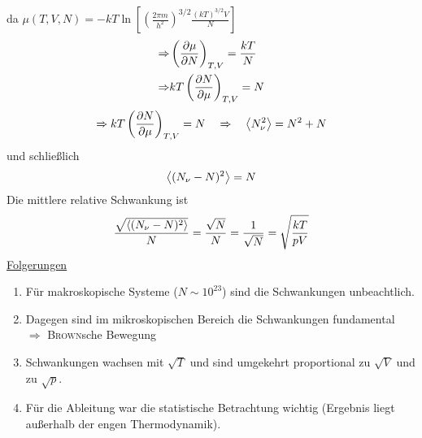 da $\mu(T, V, N) = - k T \ln \left[ \left( \frac{2 \pi m}{h^2} \right)^{3/2} \frac{ \left( k T \right)^{3/2} V}{N} \right]$
\begin{equation}
    \begin{split}
        \Rightarrow & \left( \frac{\partial \mu}{\partial N} \right)_{T, V} = \frac{k T}{N} \\
        \Rightarrow & k T \left( \frac{\partial N}{\partial \mu} \right)_{T, V} = N
    \end{split}
\end{equation}
\begin{equation}
    \Rightarrow k T \left( \frac{\partial N}{\partial \mu} \right)_{T, V} = N \quad \Rightarrow \quad \left\langle N_\nu^2\right\rangle = N^2 + N
\end{equation}
und schließlich
\begin{equation}
    \left\langle(N_\nu - N)^2\right\rangle = N
\end{equation}
Die mittlere relative Schwankung ist
\begin{equation}
    \frac{\sqrt{\left\langle(N_\nu - N)^2\right\rangle}}{N} = \frac{\sqrt{N}}{N} = \frac{1}{\sqrt{N}} = \sqrt{\frac{k T}{p V}}
\end{equation}
\underline{Folgerungen}
\begin{enumerate}
    \item Für makroskopische Systeme ($N \sim 10^{23}$) sind die Schwankungen unbeachtlich.
    \item Dagegen sind im mikroskopischen Bereich die Schwankungen fundamental \\
    $\Rightarrow$ \textsc{Brown}sche Bewegung
    \item Schwankungen wachsen mit $\sqrt{T}$ und sind umgekehrt proportional zu $\sqrt{V}$ und zu $\sqrt{p}$.
    \item Für die Ableitung war die statistische Betrachtung wichtig (Ergebnis liegt außerhalb der engen Thermodynamik).
\end{enumerate}
